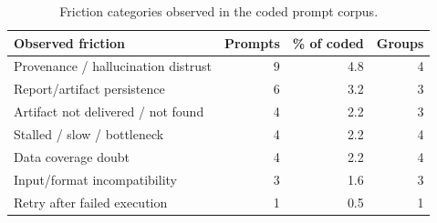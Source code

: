 \begin{table}[htbp]
\centering
\caption{Friction categories observed in the coded prompt corpus.}
\label{tab:s5-failure-modes}
\begin{tabular}{lrrr}
\toprule
Observed friction & Prompts & \% of coded & Groups \\
\midrule
Provenance / hallucination distrust & 9 & 4.8 & 4 \\
Report/artifact persistence & 6 & 3.2 & 3 \\
Artifact not delivered / not found & 4 & 2.2 & 3 \\
Stalled / slow / bottleneck & 4 & 2.2 & 4 \\
Data coverage doubt & 4 & 2.2 & 4 \\
Input/format incompatibility & 3 & 1.6 & 3 \\
Retry after failed execution & 1 & 0.5 & 1 \\
\bottomrule
\end{tabular}
\par{}
\end{table}
